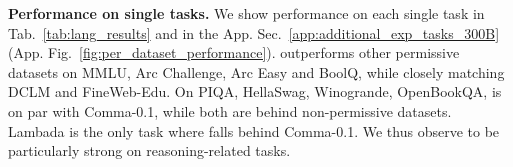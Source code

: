 




\textbf{Performance on single tasks.} We show performance on each single task in Tab.~\ref{tab:lang_results} and in the App. Sec.~\ref{app:additional_exp_tasks_300B} (App. Fig.~\ref{fig:per_dataset_performance}). \MixtureVitae{} outperforms other permissive datasets on MMLU, Arc Challenge, Arc Easy and BoolQ, while closely matching DCLM and FineWeb-Edu. On PIQA, HellaSwag, Winogrande, OpenBookQA, \MixtureVitae{} is on par with Comma-0.1, while both are behind non-permissive datasets. Lambada is the only task where \MixtureVitae{} falls behind Comma-0.1. We thus observe \MixtureVitae{} to be particularly strong on reasoning-related tasks.

